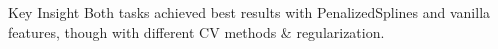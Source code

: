 \documentclass{beamer}
\begin{document}
\begin{frame}
        \begin{alertblock}{Key Insight}
            Both tasks achieved best results with PenalizedSplines and vanilla features, though with different CV methods \& regularization.
        \end{alertblock}
    \end{frame}
    
            

    
\end{document}
